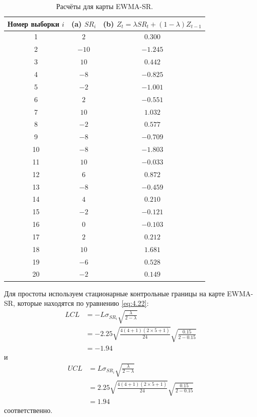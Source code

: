 \begin{table}[!ht]
	\centering
	\caption{Расчёты для карты EWMA-SR.}
	\label{tab:4.17}
	\begin{tabular}{@{}ccc@{}}\toprule
		Номер выборки \(i\) & (a) \(SR_i\) & (b) \(Z_t = \lambda SR_t + (1 - \lambda)Z_{t-1}\) \\ \midrule
		1 & \(2\) & \(0.300\) \\
		2 & \(-10\) & \(-1.245\) \\
		3 & \(10\) & \(0.442\) \\
		4 & \(-8\) & \(-0.825\) \\
		5 & \(-2\) & \(-1.001\) \\
		6 & \(2\) & \(-0.551\) \\
		7 & \(10\) & \(1.032\) \\
		8 & \(-2\) & \(0.577\) \\
		9 & \(-8\) & \(-0.709\) \\
		10 & \(-8\) & \(-1.803\) \\
		11 & \(10\) & \(-0.033\) \\
		12 & \(6\) & \(0.872\) \\
		13 & \(-8\) & \(-0.459\) \\
		14 & \(4\) & \(0.210\) \\
		15 & \(-2\) & \(-0.121\) \\
		16 & \(0\) & \(-0.103\) \\
		17 & \(2\) & \(0.212\) \\
		18 & \(10\) & \(1.681\) \\
		19 & \(-6\) & \(0.528\) \\
		20 & \(-2\) & \(0.149\) \\ \bottomrule
	\end{tabular}
\end{table}

Для простоты используем стационарные контрольные границы на карте EWMA-SR, которые находятся по уравнению \eqref{eq:4.22}:
\begin{align*}
	LCL &= -L\sigma_{SR_i}\sqrt{\frac{\lambda}{2 - \lambda}} \\
	    &= -2.25\sqrt{\frac{4(4 + 1)(2 \times 5 + 1)}{24}}\sqrt{\frac{0.15}{2 - 0.15}} \\
	    &= -1.94
\end{align*}
и
\begin{align*}
	UCL &= L\sigma_{SR_i}\sqrt{\frac{\lambda}{2 - \lambda}} \\
	    &= 2.25\sqrt{\frac{4(4 + 1)(2 \times 5 + 1)}{24}}\sqrt{\frac{0.15}{2 - 0.15}} \\
	    &= 1.94
\end{align*}
соответственно.

